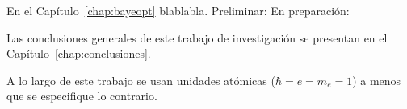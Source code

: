 En el Capítulo~\ref{chap:bayeopt} blablabla.
Preliminar: \cite{Mendez:20baye}
En preparación: \cite{Mendez:prep}

Las conclusiones generales de este trabajo de investigación se presentan 
en el Capítulo~\ref{chap:conclusiones}.

A lo largo de este trabajo se usan unidades atómicas ($\hbar=e=m_e=1$)
a menos que se especifique lo contrario.


\begin{comment}

Potenciales usados aqui para describir las estructuras atómicas y moleculares

\begin{itemize}
\item Método de inversión depurada
\item Método de potencial paramétrico de Klapish (1971)
\item Potenciales modelo (TFDA, STO + pol pot paramétricos)
\end{itemize}





Idea para intro de Chap4: 


\end{comment}
